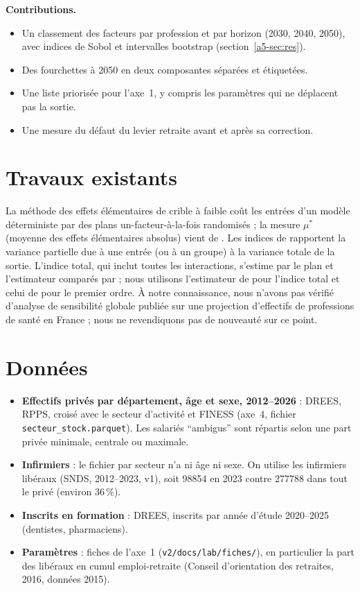 \textbf{Contributions.}
\begin{itemize}
  \item Un classement des facteurs par profession et par horizon (2030, 2040, 2050), avec indices de Sobol et
        intervalles bootstrap (section~\ref{a5-sec:res}).
  \item Des fourchettes à 2050 en deux composantes séparées et étiquetées.
  \item Une liste priorisée pour l'axe~1, y compris les paramètres qui ne déplacent pas la sortie.
  \item Une mesure du défaut du levier retraite avant et après sa correction.
\end{itemize}

\section{Travaux existants}
La méthode des effets élémentaires de \citet{a5-morris1991} crible à faible coût les entrées d'un modèle déterministe
par des plans un-facteur-à-la-fois randomisés ; la mesure $\mu^*$ (moyenne des effets élémentaires absolus) vient
de \citet{a5-campolongo2007}. Les indices de \citet{a5-sobol2001} rapportent la variance partielle
due à une entrée (ou à un groupe) à la variance totale de la sortie. L'indice total, qui inclut toutes les
interactions, s'estime par le plan et l'estimateur comparés par \citet{a5-saltelli2010} ; nous utilisons l'estimateur
de \citet{a5-jansen1999} pour l'indice total et celui de \citet{a5-saltelli2010} pour le premier ordre. À notre
connaissance, nous n'avons pas vérifié d'analyse de sensibilité globale publiée sur une projection d'effectifs de
professions de santé en France ; nous ne revendiquons pas de nouveauté sur ce point.

\section{Données}
\begin{itemize}
  \item \textbf{Effectifs privés par département, âge et sexe, 2012--2026} : DREES, RPPS, croisé avec le secteur
        d'activité et FINESS (axe~4, fichier \texttt{secteur\_stock.parquet}). Les salariés
        \enquote{ambigus} sont répartis selon une part privée minimale, centrale ou maximale.
  \item \textbf{Infirmiers} : le fichier par secteur n'a ni âge ni sexe. On utilise les infirmiers libéraux (SNDS,
        2012--2023, v1), soit \num{98854}\mesure{} en 2023 contre \num{277788}\mesure{} dans tout le privé
        (environ 36\,\%\derive{}).
  \item \textbf{Inscrits en formation} : DREES, inscrits par année d'étude 2020--2025 (dentistes, pharmaciens).
  \item \textbf{Paramètres} : fiches de l'axe~1 (\texttt{v2/docs/lab/fiches/}), en particulier la part des
        libéraux en cumul emploi-retraite (Conseil d'orientation des retraites, 2016, données 2015).
\end{itemize}

